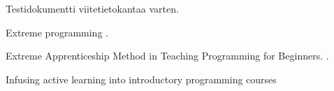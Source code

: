 \documentclass{article}
\begin{document}
Testidokumentti viitetietokantaa varten.

Extreme programming \cite{Beck2004Extreme}.

Extreme Apprenticeship Method in Teaching Programming for Beginners. \cite{Vihavainen2011Extreme}.

Infusing active learning into introductory programming courses \cite{Whittington2004Infusing}



\end{document}
